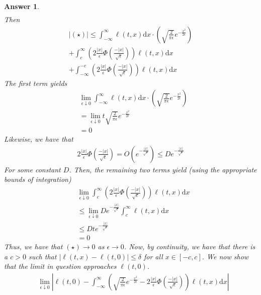 \documentclass[12pt]{article}
\theoremstyle{colon}
\newtheorem*{answer}{Answer}
\begin{document}
\begin{answer}
\begin{align*}
  \end{align*}
  Then
  \begin{gather*}
    \lvert (\star) \rvert \leq \int_{-\infty}^\infty \ell(t,x) \text{d} x \cdot \left( \sqrt{\frac{2}{\pi \epsilon}} e^{-\frac{x^2}{2 \epsilon}} \right) \\
    + \int_{c}^\infty \left( 2 \frac{\lvert x \rvert}{\epsilon} \Phi\left(\frac{-\lvert x \rvert }{\sqrt{\epsilon}}\right) \right) \ell(t,x) \text{d}x \\
    + \int_{-\infty}^{-c} \left( 2 \frac{\lvert x \rvert}{\epsilon} \Phi\left(\frac{-\lvert x \rvert }{\sqrt{\epsilon}}\right) \right) \ell(t,x) \text{d}x
  \end{gather*}
  The first term yields
  \begin{align*}
    &\lim_{\epsilon \downarrow 0} \int_{-\infty}^\infty \ell(t,x) \text{d} x \cdot \left( \sqrt{\frac{2}{\pi \epsilon}} e^{-\frac{x^2}{2 \epsilon}} \right) \\
    &= \lim_{\epsilon \downarrow 0} t \sqrt{\frac{2}{\pi \epsilon}} e^{-\frac{x^2}{2 \epsilon}} \\
    &= 0
  \end{align*}
  Likewise, we have that
  \begin{gather*}
    2 \frac{\lvert x \rvert}{\epsilon} \Phi\left(\frac{-\lvert x \rvert }{\sqrt{\epsilon}}\right) = O(e^{-\frac{\lvert x \rvert}{\sqrt{\epsilon}}}) \leq D e^{-\frac{\lvert x \rvert}{\sqrt{\epsilon}}}
  \end{gather*}
  For some constant $D$. Then, the remaining two terms yield (using the appropriate bounds of integration)
  \begin{align*}
    &\lim_{\epsilon \downarrow 0} \int_{c}^\infty \left( 2 \frac{\lvert x \rvert}{\epsilon} \Phi\left(\frac{-\lvert x \rvert }{\sqrt{\epsilon}}\right) \right) \ell(t,x) \text{d}x \\
    &\leq \lim_{\epsilon \downarrow 0} De^{-\frac{\lvert x \rvert}{\sqrt{\epsilon}}} \int_{c}^\infty \ell(t,x) \text{d}x \\
    &\leq Dte^{-\frac{\lvert x \rvert}{\sqrt{\epsilon}}} \\
    &= 0
  \end{align*}
  Thus, we have that $(\star) \rightarrow 0$ as $\epsilon \rightarrow 0$. Now, by continuity, we have that there is a $c > 0$ such that $\lvert \ell(t,x) - \ell(t,0) \rvert \leq \delta$ for all $x \in [-c,c]$. We now show that the limit in question approaches $\ell(t,0)$.
  \begin{align*}
    &\lim_{\epsilon \downarrow 0} \left\lvert \ell(t,0) - \int_{-\infty}^\infty \left(\sqrt{\frac{2}{\pi \epsilon}} e^{-\frac{x^2}{2 \epsilon}}  - 2 \frac{\lvert x \rvert}{\epsilon} \Phi\left(\frac{-\lvert x \rvert }{\sqrt{\epsilon}}\right) \right) \ell(t,x) \text{d}x \right\rvert \\

\end{align*}
\end{answer}
\end{document}
